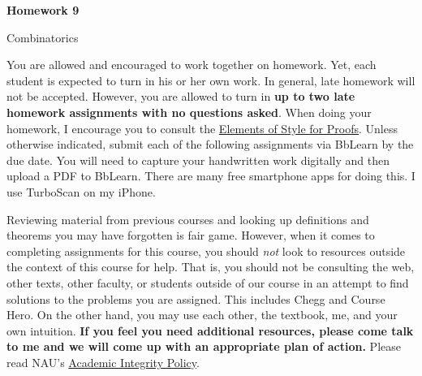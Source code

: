 \documentclass[11pt]{article}%
\theoremstyle{definition}
\newcommand{\blankline}{\pagebreak[2]\vspace{.5\baselineskip}}
\begin{document}
\begin{center}
{\Large\bf Homework 9}

\smallskip

Combinatorics
\end{center}

\thispagestyle{fancy}

You are allowed and encouraged to work together on homework. Yet, each student is expected to turn in his or her own work. In general, late homework will not be accepted. However, you are allowed to turn in \textbf{up to two late homework assignments with no questions asked}. When doing your homework, I encourage you to consult the \href{http://danaernst.com/teaching/ElementsOfStyle.pdf}{Elements of Style for Proofs}. Unless otherwise indicated, submit each of the following assignments via BbLearn by the due date. You will need to capture your handwritten work digitally and then upload a PDF to BbLearn. There are many free smartphone apps for doing this. I use TurboScan on my iPhone.

\blankline

Reviewing material from previous courses and looking up definitions and theorems you may have forgotten is fair game. However, when it comes to completing assignments for this course, you should \emph{not} look to resources outside the context of this course for help.  That is, you should not be consulting the web, other texts, other faculty, or students outside of our course in an attempt to find solutions to the problems you are assigned.  This includes Chegg and Course Hero. On the other hand, you may use each other, the textbook, me, and your own intuition. \textbf{If you feel you need additional resources, please come talk to me and we will come up with an appropriate plan of action.} Please read NAU's \href{https://www5.nau.edu/policies/Client/Details/828?whoIsLooking=Students&pertainsTo=All&sortDirection=Ascending&page=1}{Academic Integrity Policy}.

\blankline
\end{document}
